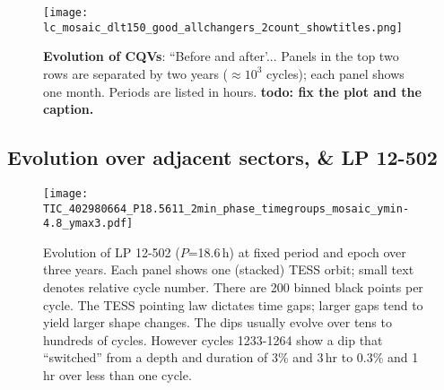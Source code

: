\documentclass[11pt,twocolumn,tighten]{aastex63}
\begin{document}
\begin{figure*}[!t]
	\begin{center}
		\centering
		\texttt{[image: lc\_mosaic\_dlt150\_good\_allchangers\_2count\_showtitles.png]}
		\vspace{-0.2cm}
		\caption{
			{\bf Evolution of CQVs}: ``Before and
			after'...  Panels
			in the top two rows are separated by two years
			($\approx$$10^3$ cycles); each panel shows one month.
			Periods are listed in hours. 
			{\bf todo: fix the plot and the caption.}
		}
		\label{fig:evoln}
	\end{center}
\end{figure*}




\subsection{Evolution over adjacent sectors, \& LP 12-502}
\begin{figure*}[!t]
	\begin{center}
		\centering
		\texttt{[image: TIC\_402980664\_P18.5611\_2min\_phase\_timegroups\_mosaic\_ymin-4.8\_ymax3.pdf]}
		\vspace{-0.45cm}
		\caption{
			Evolution of LP 12-502 ($P$=18.6\,h) at fixed period and
			epoch over three years. 
			Each panel shows one (stacked) TESS orbit; small text denotes relative cycle number.
			There are 200 binned black points per cycle.
			The TESS pointing law dictates time gaps; larger gaps tend to
			yield larger shape changes.
			The dips usually evolve over tens to hundreds of cycles.
			However cycles 1233-1264 show a dip that ``switched'' from a depth
			and duration of 3\% and 3\,hr to 0.3\% and 1\,hr over less than
			one cycle.
		}
		\label{fig:lp}
	\end{center}


\end{figure*}
\end{document}
